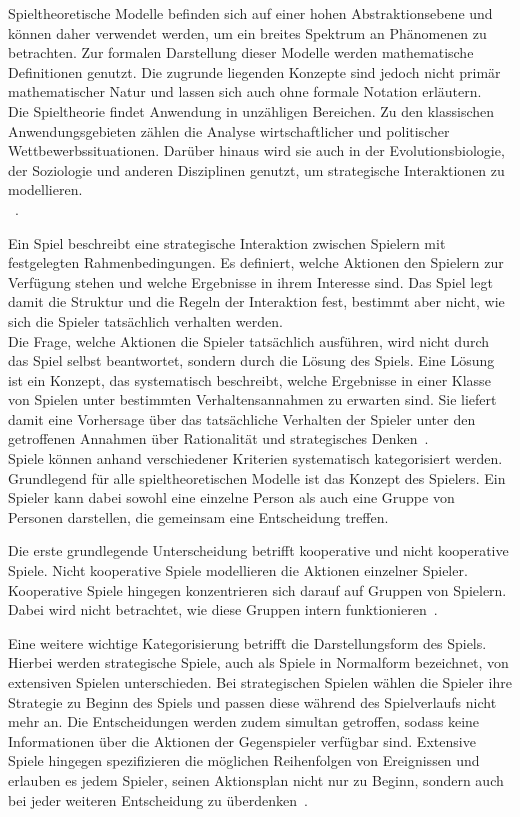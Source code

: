 Spieltheoretische Modelle befinden sich auf einer hohen Abstraktionsebene und können daher verwendet werden, um ein breites Spektrum an Phänomenen zu betrachten. 
Zur formalen Darstellung dieser Modelle werden mathematische Definitionen genutzt. 
Die zugrunde liegenden Konzepte sind jedoch nicht primär mathematischer Natur und lassen sich auch ohne formale Notation erläutern.\\
Die Spieltheorie findet Anwendung in unzähligen Bereichen.
Zu den klassischen Anwendungsgebieten zählen die Analyse wirtschaftlicher und politischer Wettbewerbssituationen. 
Darüber hinaus wird sie auch in der Evolutionsbiologie, der Soziologie und anderen Disziplinen genutzt, um strategische Interaktionen zu modellieren.\\
~\cite[Kap.~1.1]{osborne1994course}.

Ein Spiel beschreibt eine strategische Interaktion zwischen Spielern mit festgelegten Rahmenbedingungen. 
Es definiert, welche Aktionen den Spielern zur Verfügung stehen und welche Ergebnisse in ihrem Interesse sind.
Das Spiel legt damit die Struktur und die Regeln der Interaktion fest, bestimmt aber nicht, wie sich die Spieler tatsächlich verhalten werden.\\
Die Frage, welche Aktionen die Spieler tatsächlich ausführen, wird nicht durch das Spiel selbst beantwortet, sondern durch die Lösung des Spiels.
Eine Lösung ist ein Konzept, das systematisch beschreibt, welche Ergebnisse in einer Klasse von Spielen unter bestimmten Verhaltensannahmen zu erwarten sind.
Sie liefert damit eine Vorhersage über das tatsächliche Verhalten der Spieler unter den getroffenen Annahmen über Rationalität und strategisches Denken~\cite[Kap.~1.2]{osborne1994course}.\\
Spiele können anhand verschiedener Kriterien systematisch kategorisiert werden.
Grundlegend für alle spieltheoretischen Modelle ist das Konzept des Spielers. 
Ein Spieler kann dabei sowohl eine einzelne Person als auch eine Gruppe von Personen darstellen, die gemeinsam eine Entscheidung treffen.

Die erste grundlegende Unterscheidung betrifft kooperative und nicht kooperative Spiele.
Nicht kooperative Spiele modellieren die Aktionen einzelner Spieler. 
Kooperative Spiele hingegen konzentrieren sich darauf auf Gruppen von Spielern.
Dabei wird nicht betrachtet, wie diese Gruppen intern funktionieren~\cite[Kap.~1.2]{osborne1994course}.

Eine weitere wichtige Kategorisierung betrifft die Darstellungsform des Spiels. 
Hierbei werden strategische Spiele, auch als Spiele in Normalform bezeichnet, von extensiven Spielen unterschieden. 
Bei strategischen Spielen wählen die Spieler ihre Strategie zu Beginn des Spiels und passen diese während des Spielverlaufs nicht mehr an. 
Die Entscheidungen werden zudem simultan getroffen, sodass keine Informationen über die Aktionen der Gegenspieler verfügbar sind. 
Extensive Spiele hingegen spezifizieren die möglichen Reihenfolgen von Ereignissen und erlauben es jedem Spieler, seinen Aktionsplan nicht nur zu Beginn, sondern auch bei jeder weiteren Entscheidung zu überdenken~\cite[Kap.~1.2]{osborne1994course}.

